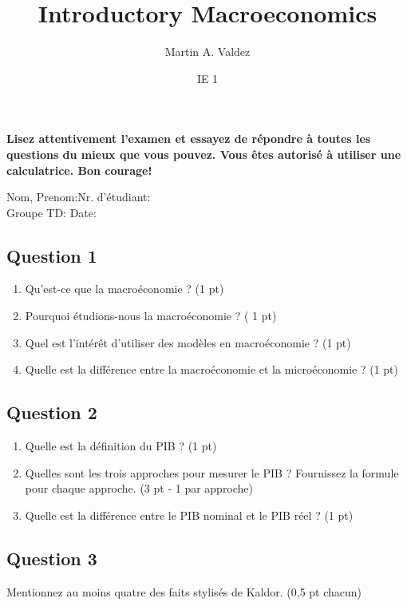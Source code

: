 \documentclass[11pt]{article}
\title{Introductory Macroeconomics}
\author{Martin A. Valdez}
\date{IE 1\\}
\begin{document}
\maketitle
\textbf{Lisez attentivement l'examen et essayez de répondre à toutes les questions du mieux que vous 
pouvez. 
Vous êtes autorisé à utiliser une calculatrice. Bon courage!}


\begin{flushleft}

Nom, Prenom:\underline{\hspace{5cm}}\hfil Nr. d'étudiant:\underline{\hspace{4cm}}\\
Groupe TD:\underline{\hspace{5cm}} \hfill Date:\underline{\hspace{5cm}}


\end{flushleft}
\subsection*{Question 1}

\begin{enumerate}
    \item Qu'est-ce que la macroéconomie ? (1 pt)
    \item Pourquoi étudions-nous la macroéconomie ? ( 1 pt)
    \item Quel est l'intérêt d'utiliser des modèles en macroéconomie ? (1 pt)
    \item Quelle est la différence entre la macroéconomie et la microéconomie ? (1 pt)
\end{enumerate}

\subsection*{Question 2}
\begin{enumerate}
    \item Quelle est la définition du PIB ? (1 pt)
    \item Quelles sont les trois approches pour mesurer le PIB ? Fournissez la formule pour chaque approche. (3 pt - 1 par approche)
    \item Quelle est la différence entre le PIB nominal et le PIB réel ? (1 pt)
\end{enumerate}

\subsection*{Question 3}
Mentionnez au moins quatre des faits stylisés de Kaldor. (0,5 pt chacun)
\end{document}
